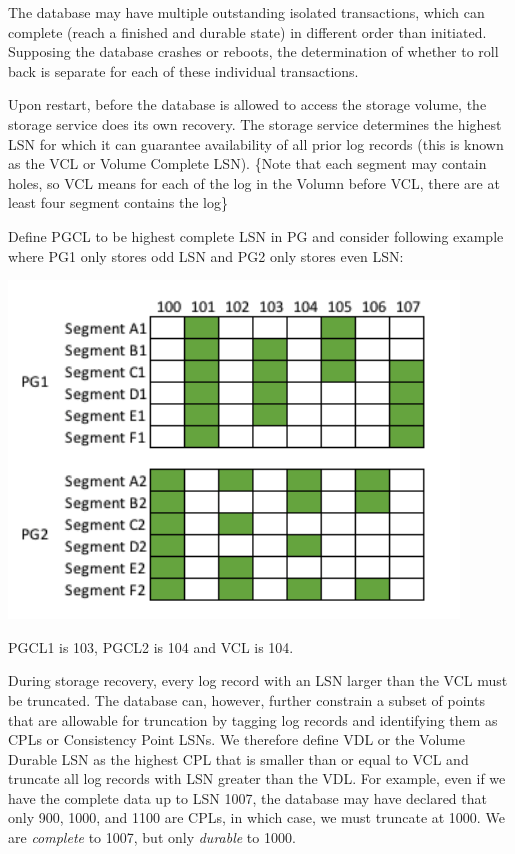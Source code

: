\documentclass[11pt]{article}
\begin{document}
The database may have multiple outstanding isolated transactions, which can complete (reach a finished
and durable state) in  different order than initiated. Supposing the database crashes or reboots, the
determination of whether to roll back is separate for each of these individual transactions.

Upon restart, before the database is allowed to access the storage volume, the storage service does
its own recovery. The storage service determines the highest LSN for which it can guarantee
availability of all prior log records (this is known as the VCL or Volume Complete LSN).
\wu\{Note that each segment may contain holes, so VCL means for each of the log in the Volumn before
VCL, there are at least four segment contains the log\}

Define PGCL to be highest complete LSN in PG and consider following example where PG1 only stores odd
LSN and PG2 only stores even LSN:
\begin{center}
\includegraphics[width=.8\textwidth]{../../images/papers/50.png}
\label{}
\end{center}
PGCL1 is 103, PGCL2 is 104 and VCL is 104.

During storage recovery, every log record with an LSN larger than the VCL must be truncated. The database
can, however, further constrain a subset of points that are allowable for truncation by tagging log
records and identifying them as CPLs or Consistency Point LSNs. We therefore define VDL or the Volume
Durable LSN as the highest CPL that is smaller than or equal to VCL and truncate all log records with
LSN greater than the VDL. For example, even if we have the complete data up to LSN 1007, the database
may have declared that only 900, 1000, and 1100 are CPLs, in which case, we must truncate at 1000. We
are \emph{complete} to 1007, but only \emph{durable} to 1000.
\end{document}
